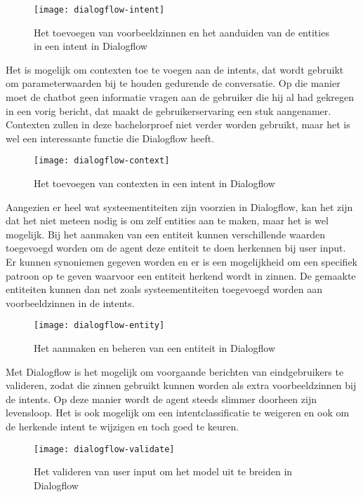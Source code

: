 \begin{figure}[H]
    \label{fig:dialogflow-intent}
    \centering
    \texttt{[image: dialogflow-intent]}
    \caption{Het toevoegen van voorbeeldzinnen en het aanduiden van de entities in een intent in Dialogflow}
\end{figure}

Het is mogelijk om contexten toe te voegen aan de intents, dat wordt gebruikt om parameterwaarden bij te houden gedurende de conversatie. Op die manier moet de chatbot geen informatie vragen aan de gebruiker die hij al had gekregen in een vorig bericht, dat maakt de gebruikerservaring een stuk aangenamer. Contexten zullen in deze bachelorproef niet verder worden gebruikt, maar het is wel een interessante functie die Dialogflow heeft.

\begin{figure}[H]
    \label{fig:dialogflow-context}
    \centering
    \texttt{[image: dialogflow-context]}
    \caption{Het toevoegen van contexten in een intent in Dialogflow}
\end{figure}

Aangezien er heel wat systeementiteiten zijn voorzien in Dialogflow, kan het zijn dat het niet meteen nodig is om zelf entities aan te maken, maar het is wel mogelijk. Bij het aanmaken van een entiteit kunnen verschillende waarden toegevoegd worden om de agent deze entiteit te doen herkennen bij user input. Er kunnen synoniemen gegeven worden en er is een mogelijkheid om een specifiek patroon op te geven waarvoor een entiteit herkend wordt in zinnen. De gemaakte entiteiten kunnen dan net zoals systeementiteiten toegevoegd worden aan voorbeeldzinnen in de intents.

\begin{figure}[H]
    \label{fig:dialogflow-entity}
    \centering
    \texttt{[image: dialogflow-entity]}
    \caption{Het aanmaken en beheren van een entiteit in Dialogflow}
\end{figure}

Met Dialogflow is het mogelijk om voorgaande berichten van eindgebruikers te valideren, zodat die zinnen gebruikt kunnen worden als extra voorbeeldzinnen bij de intents. Op deze manier wordt de agent steeds slimmer doorheen zijn levensloop. Het is ook mogelijk om een intentclassificatie te weigeren en ook om de herkende intent te wijzigen en toch goed te keuren. 

\begin{figure}[H]
    \label{fig:dialogflow-validate}
    \centering
    \texttt{[image: dialogflow-validate]}
    \caption{Het valideren van user input om het model uit te breiden in Dialogflow}
\end{figure}

